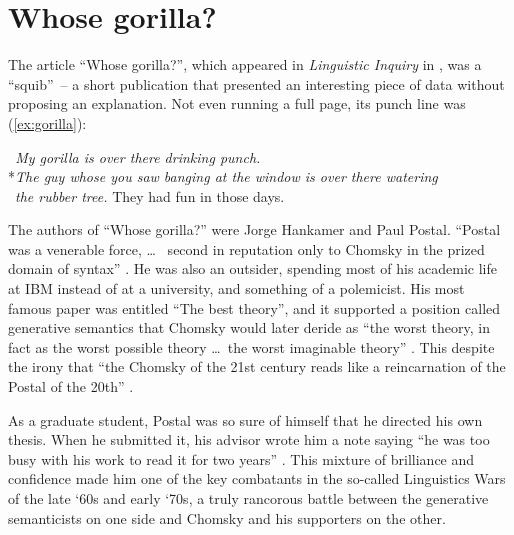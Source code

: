 


\section{Whose gorilla?}

The article \enquote{Whose gorilla?}, which appeared in \textit{Linguistic Inquiry} in \citeyear{Hankamer1973}, was a \enquote{squib}~-- a short publication that presented an interesting piece of data without proposing an explanation. Not even running a full page, its punch line was (\ref{ex:gorilla}):

\ea \label{ex:gorilla}
 \textit{~My gorilla is over there drinking punch.} \\
 *\textit{The guy whose you saw banging at the window is over there watering}\\~\textit{the rubber tree.}
\z
They had fun in those days.

The authors of \enquote{Whose gorilla?} were Jorge Hankamer and Paul Postal. \enquote{Postal was a venerable force, \dots~ second in reputation only to Chomsky in the prized domain of syntax} \citep[127--128]{Harris2021}. He was also an outsider, spending most of his academic life at IBM instead of at a university, and something of a polemicist. His most famous paper was entitled \enquote{The best theory}, and it supported a position called generative semantics that Chomsky would later deride as \enquote{the worst theory, in fact as the worst possible theory \dots~the worst imaginable theory} \citep[129]{Harris2021}. This despite the irony that \enquote{the Chomsky of the 21st century reads like a reincarnation of the Postal of the 20th} \citep[418]{Newmeyer2003}.

As a graduate student, Postal was so sure of himself that he directed his own thesis. When he submitted it, his advisor wrote him a note saying \enquote{he was too busy with his work to read it for two years} \citep{PostalInterview2020}. This mixture of brilliance and confidence made him one of the key combatants in the so-called Linguistics Wars of the late `60s and early `70s, a truly rancorous battle between the generative semanticists on one side and Chomsky and his supporters on the other.

